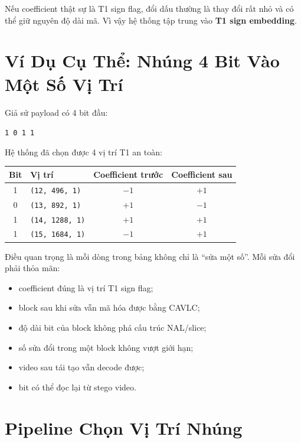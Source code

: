 \documentclass[11pt,a4paper]{article}
\begin{document}
Nếu coefficient thật sự là T1 sign flag, đổi dấu thường là thay đổi rất nhỏ và
có thể giữ nguyên độ dài mã. Vì vậy hệ thống tập trung vào \textbf{T1 sign
embedding}.

\section{Ví Dụ Cụ Thể: Nhúng 4 Bit Vào Một Số Vị Trí}

Giả sử payload có 4 bit đầu:

\begin{center}
\texttt{1 0 1 1}
\end{center}

Hệ thống đã chọn được 4 vị trí T1 an toàn:

\begin{center}
\begin{tabular}{clcc}
\toprule
Bit & Vị trí & Coefficient trước & Coefficient sau \\
\midrule
1 & \texttt{(12, 496, 1)} & \(-1\) & \(+1\) \\
0 & \texttt{(13, 892, 1)} & \(+1\) & \(-1\) \\
1 & \texttt{(14, 1288, 1)} & \(+1\) & \(+1\) \\
1 & \texttt{(15, 1684, 1)} & \(-1\) & \(+1\) \\
\bottomrule
\end{tabular}
\end{center}

Điều quan trọng là mỗi dòng trong bảng không chỉ là ``sửa một số''. Mỗi sửa đổi
phải thỏa mãn:

\begin{itemize}[leftmargin=*]
  \item coefficient đúng là vị trí T1 sign flag;
  \item block sau khi sửa vẫn mã hóa được bằng CAVLC;
  \item độ dài bit của block không phá cấu trúc NAL/slice;
  \item số sửa đổi trong một block không vượt giới hạn;
  \item video sau tái tạo vẫn decode được;
  \item bit có thể đọc lại từ stego video.
\end{itemize}

\section{Pipeline Chọn Vị Trí Nhúng}
\end{document}
